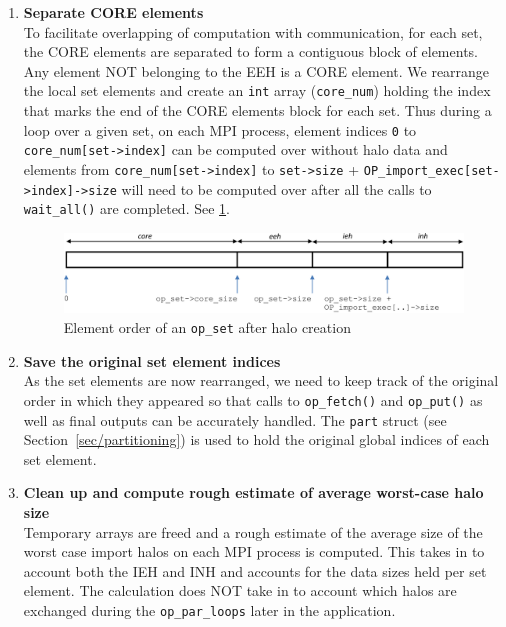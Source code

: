 \documentclass[11pt]{article}
\begin{document}
\begin{enumerate}
\item \textbf{Separate CORE elements}\\
To facilitate overlapping of computation with communication, for each set, the CORE elements are separated to form a
contiguous block of elements. Any element NOT belonging to the EEH is a CORE element. We rearrange the local set
elements and create an \texttt{int} array (\texttt{core\_num}) holding the index that marks the end of the CORE
elements block for each set. Thus during a loop over a given set, on each MPI process, element indices \texttt{0} to
\texttt{core\_num[set->index]} can be computed over without halo data and elements from \texttt{core\_num[set->index]}
to \texttt{set->size} + \texttt{OP\_import\_exec[set->index]->size} will need to be computed over after all the calls to
\texttt{wait\_all()} are completed. See \figurename{ \ref{fig/elementorganization}}.

\begin{figure}[ht]\centering\vspace{-0pt}\hspace{10pt}
\includegraphics[width=14cm]{elementorder}\vspace{-0pt}
\caption{Element order of an \texttt{op\_set} after halo creation}\label{fig/elementorganization}\vspace{-0pt}
\end{figure}

\item \textbf{Save the original set element indices}\\
As the set elements are now rearranged, we need to keep track of the original order in which they appeared so that
calls to \texttt{op\_fetch()} and \texttt{op\_put()} as well as final outputs can be accurately handled. The
\texttt{part} struct (see Section~\ref{sec/partitioning}) is used to hold the original global indices of each set
element.

\item \textbf{Clean up and compute rough estimate of average worst-case halo size}\\
Temporary arrays are freed and a rough estimate of the average size of the worst case import halos on each MPI process
is computed. This takes in to account both the IEH and INH and accounts for the data sizes held per set element. The
calculation does NOT take in to account which halos are exchanged during the \texttt{op\_par\_loops} later in the
application.
\end{enumerate}
\end{document}
